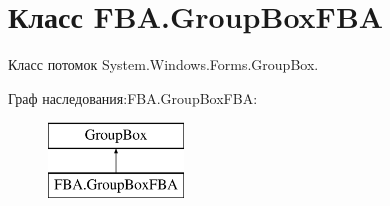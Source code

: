 \hypertarget{class_f_b_a_1_1_group_box_f_b_a}{}\section{Класс F\+B\+A.\+Group\+Box\+F\+BA}
\label{class_f_b_a_1_1_group_box_f_b_a}


Класс потомок System.\+Windows.\+Forms.\+Group\+Box.  


Граф наследования\+:F\+B\+A.\+Group\+Box\+F\+BA\+:\begin{figure}[H]
\begin{center}
\leavevmode
\includegraphics[height=2.000000cm]{class_f_b_a_1_1_group_box_f_b_a}
\end{center}
\end{figure}
